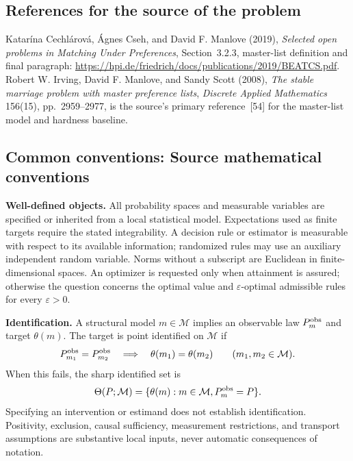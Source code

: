 \documentclass[11pt,a4paper]{article}
\begin{document}
\subsection*{References for the source of the problem}
Katar\'ina Cechl\'arov\'a, \'Agnes Cseh, and David F. Manlove (2019), \emph{Selected open problems in Matching Under Preferences}, Section~3.2.3, master-list definition and final paragraph: \url{https://hpi.de/friedrich/docs/publications/2019/BEATCS.pdf}. Robert W. Irving, David F. Manlove, and Sandy Scott (2008), \emph{The stable marriage problem with master preference lists}, \emph{Discrete Applied Mathematics} 156(15), pp.~2959--2977, is the source's primary reference~[54] for the master-list model and hardness baseline.

\subsection*{Common conventions: Source mathematical conventions}

\textbf{Well-defined objects.}
All probability spaces and measurable variables are specified or inherited
from a local statistical model. Expectations used as finite targets require
the stated integrability. A decision rule or estimator is measurable with
respect to its available information; randomized rules may use an auxiliary
independent random variable. Norms without a subscript are Euclidean in
finite-dimensional spaces. An optimizer is requested only when attainment
is assured; otherwise the question concerns the optimal value and
$\varepsilon$-optimal admissible rules for every $\varepsilon>0$.

\textbf{Identification.}
A structural model $m\in\mathcal M$ implies an observable law
$P_m^{\rm obs}$ and target $\theta(m)$. The target is point identified on
$\mathcal M$ if
\[
 P_{m_1}^{\rm obs}=P_{m_2}^{\rm obs}
 \quad\Longrightarrow\quad\theta(m_1)=\theta(m_2)
 \qquad(m_1,m_2\in\mathcal M).
\]
When this fails, the sharp identified set is
\[
 \Theta(P;\mathcal M)=\{\theta(m):m\in\mathcal M,
                                  P_m^{\rm obs}=P\}.
\]
Specifying an intervention or estimand does not establish identification.
Positivity, exclusion, causal sufficiency, measurement restrictions, and
transport assumptions are substantive local inputs, never automatic
consequences of notation.
\end{document}

